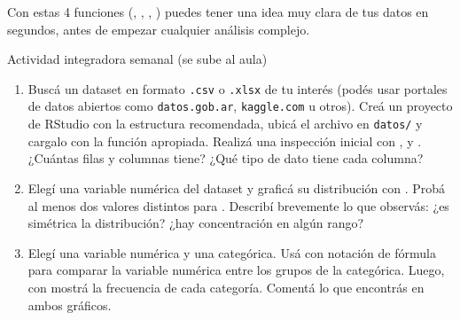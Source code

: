 \documentclass[8pt]{beamer}
\begin{document}
\begin{frame}[fragile]
	Con estas 4 funciones (, , , ) puedes tener una idea muy clara de tus datos en segundos, antes de empezar cualquier análisis complejo.	
\end{frame}


\begin{frame}[fragile]{Actividad integradora semanal (se sube al aula)}
	\begin{enumerate}
		\item Buscá un dataset en formato \texttt{.csv} o \texttt{.xlsx} de tu interés (podés usar portales de datos abiertos como \texttt{datos.gob.ar}, \texttt{kaggle.com} u otros). Creá un proyecto de RStudio con la estructura recomendada, ubicá el archivo en \texttt{datos/} y cargalo con la función apropiada. Realizá una inspección inicial con ,  y . ¿Cuántas filas y columnas tiene? ¿Qué tipo de dato tiene cada columna?

		\item Elegí una variable numérica del dataset y graficá su distribución con . Probá al menos dos valores distintos para . Describí brevemente lo que observás: ¿es simétrica la distribución? ¿hay concentración en algún rango?

		\item Elegí una variable numérica y una categórica. Usá  con notación de fórmula para comparar la variable numérica entre los grupos de la categórica. Luego, con  mostrá la frecuencia de cada categoría. Comentá lo que encontrás en ambos gráficos.
	\end{enumerate}
\end{frame}
\end{document}
